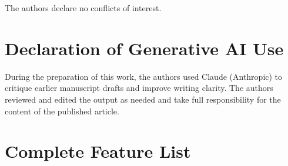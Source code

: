 \documentclass[12pt]{article}
\begin{document}
The authors declare no conflicts of interest.

\section*{Declaration of Generative AI Use}

During the preparation of this work, the authors used Claude (Anthropic) to critique earlier
manuscript drafts and improve writing clarity. The authors reviewed and edited the output as
needed and take full responsibility for the content of the published article.

\appendix
\section{Complete Feature List}
\label{app:features}
\end{document}
